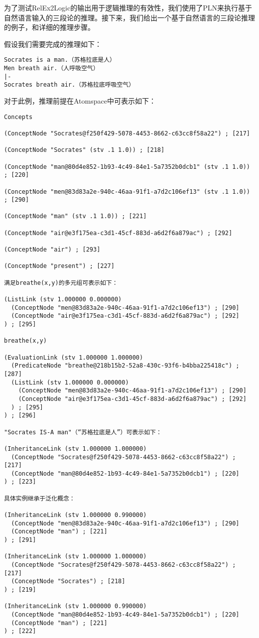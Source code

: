 为了测试RelEx2Logic的输出用于逻辑推理的有效性，我们使用了PLN来执行基于自然语言输入的三段论的推理。接下来，我们给出一个基于自然语言的三段论推理的例子，和详细的推理步骤。


假设我们需要完成的推理如下：

\begin{verbatim}
Socrates is a man.（苏格拉底是人）
Men breath air.（人呼吸空气）
|- 
Socrates breath air.（苏格拉底呼吸空气）
\end{verbatim}

对于此例，推理前提在Atomspace中可表示如下：

{\tt\begin{small}\begin{lstlisting}
Concepts

(ConceptNode "Socrates@f250f429-5078-4453-8662-c63cc8f58a22") ; [217]

(ConceptNode "Socrates" (stv .1 1.0)) ; [218]

(ConceptNode "man@80d4e852-1b93-4c49-84e1-5a7352b0dcb1" (stv .1 1.0)) ; [220]

(ConceptNode "men@83d83a2e-940c-46aa-91f1-a7d2c106ef13" (stv .1 1.0)) ; [290]

(ConceptNode "man" (stv .1 1.0)) ; [221]

(ConceptNode "air@e3f175ea-c3d1-45cf-883d-a6d2f6a879ac") ; [292]

(ConceptNode "air") ; [293]

(ConceptNode "present") ; [227]

满足breathe(x,y)的多元组可表示如下：

(ListLink (stv 1.000000 0.000000)
  (ConceptNode "men@83d83a2e-940c-46aa-91f1-a7d2c106ef13") ; [290]
  (ConceptNode "air@e3f175ea-c3d1-45cf-883d-a6d2f6a879ac") ; [292]
) ; [295]

breathe(x,y)

(EvaluationLink (stv 1.000000 1.000000)
  (PredicateNode "breathe@218b15b2-52a8-430c-93f6-b4bba225418c") ; [287]
  (ListLink (stv 1.000000 0.000000)
    (ConceptNode "men@83d83a2e-940c-46aa-91f1-a7d2c106ef13") ; [290]
    (ConceptNode "air@e3f175ea-c3d1-45cf-883d-a6d2f6a879ac") ; [292]
  ) ; [295]
) ; [296]

"Socrates IS-A man"（“苏格拉底是人”）可表示如下：

(InheritanceLink (stv 1.000000 1.000000)
  (ConceptNode "Socrates@f250f429-5078-4453-8662-c63cc8f58a22") ; [217]
  (ConceptNode "man@80d4e852-1b93-4c49-84e1-5a7352b0dcb1") ; [220]
) ; [223]

具体实例继承于泛化概念：

(InheritanceLink (stv 1.000000 0.990000)
  (ConceptNode "men@83d83a2e-940c-46aa-91f1-a7d2c106ef13") ; [290]
  (ConceptNode "man") ; [221]
) ; [291]

(InheritanceLink (stv 1.000000 1.000000)
  (ConceptNode "Socrates@f250f429-5078-4453-8662-c63cc8f58a22") ; [217]
  (ConceptNode "Socrates") ; [218]
) ; [219]

(InheritanceLink (stv 1.000000 0.990000)
  (ConceptNode "man@80d4e852-1b93-4c49-84e1-5a7352b0dcb1") ; [220]
  (ConceptNode "man") ; [221]
) ; [222]
 \end{lstlisting}\end{small}}
 


